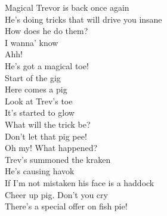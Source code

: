 \vspace{10pt}
Magical Trevor is back once again\\
He's doing tricks that will drive you insane\\
How does he do them?\\
I wanna' know\\
Ahh!\\
He's got a magical toe!\\
Start of the gig\\
Here comes a pig\\
Look at Trev's toe\\
It's started to glow\\
What will the trick be?\\
Don't let that pig pee!\\
Oh my! What happened?\\
Trev's summoned the kraken\\
He's causing havok\\
If I'm not mistaken his face is a haddock\\
Cheer up pig. Don't you cry\\
There's a special offer on fish pie!
